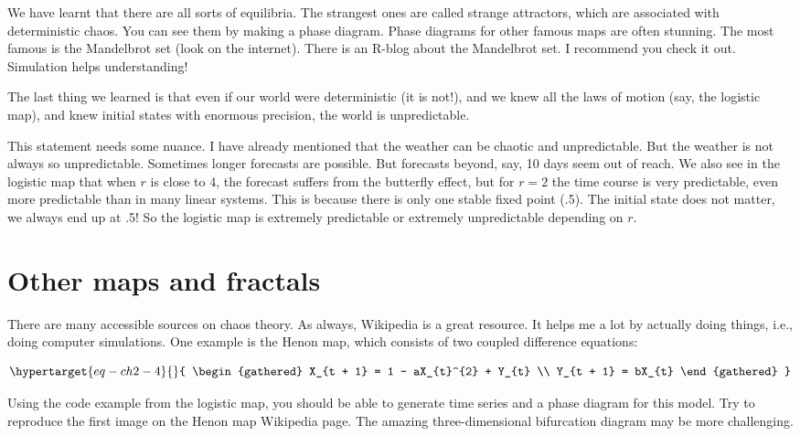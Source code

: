 \documentclass[
  a4paper,
  DIV=11,
  numbers=noendperiod,
  oneside]{scrreprt}
\begin{document}
We have learnt that there are all sorts of equilibria. The strangest
ones are called strange attractors, which are associated with
deterministic chaos. You can see them by making a phase diagram. Phase
diagrams for other famous maps are often stunning. The most famous is
the Mandelbrot set (look on the internet). There is an R-blog about the
Mandelbrot set. I recommend you check it out. Simulation helps
understanding!

The last thing we learned is that even if our world were deterministic
(it is not!), and we knew all the laws of motion (say, the logistic
map), and knew initial states with enormous precision, the world is
unpredictable.

This statement needs some nuance. I have already mentioned that the
weather can be chaotic and unpredictable. But the weather is not always
so unpredictable. Sometimes longer forecasts are possible. But forecasts
beyond, say, 10 days seem out of reach. We also see in the logistic map
that when \(r\) is close to 4, the forecast suffers from the butterfly
effect, but for \(r = 2\) the time course is very predictable, even more
predictable than in many linear systems. This is because there is only
one stable fixed point (.5). The initial state does not matter, we
always end up at .5! So the logistic map is extremely predictable or
extremely unpredictable depending on \(r\).

\hypertarget{sec-Other-maps-and-fractals}{%
\section{Other maps and fractals}\label{sec-Other-maps-and-fractals}}

There are many accessible sources on chaos theory. As always, Wikipedia
is a great resource. It helps me a lot by actually doing things, i.e.,
doing computer simulations. One example is the Henon map, which consists
of two coupled difference equations:

\begin{equation}\protect\hypertarget{eq-ch2-4}{}{
\begin{gathered}
X_{t + 1} = 1 - aX_{t}^{2} + Y_{t} \\
Y_{t + 1} = bX_{t} 
\end{gathered}
}\label{eq-ch2-4}\end{equation}

Using the code example from the logistic map, you should be able to
generate time series and a phase diagram for this model. Try to
reproduce the first image on the Henon map Wikipedia page. The amazing
three-dimensional bifurcation diagram may be more challenging.
\end{document}
